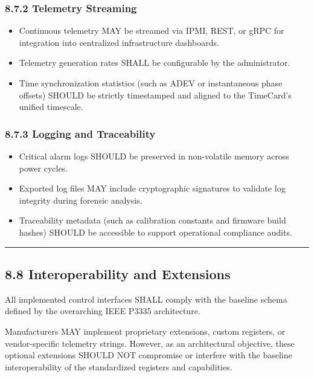 \subsubsection{8.7.2 Telemetry Streaming}\label{telemetry-streaming}

\begin{itemize}
\tightlist
\item
  Continuous telemetry MAY be streamed via IPMI, REST, or gRPC for
  integration into centralized infrastructure dashboards.
\item
  Telemetry generation rates SHALL be configurable by the administrator.
\item
  Time synchronization statistics (such as ADEV or instantaneous phase
  offsets) SHOULD be strictly timestamped and aligned to the TimeCard's
  unified timescale.
\end{itemize}

\subsubsection{8.7.3 Logging and
Traceability}\label{logging-and-traceability}

\begin{itemize}
\tightlist
\item
  Critical alarm logs SHOULD be preserved in non-volatile memory across
  power cycles.
\item
  Exported log files MAY include cryptographic signatures to validate
  log integrity during forensic analysis.
\item
  Traceability metadata (such as calibration constants and firmware
  build hashes) SHOULD be accessible to support operational compliance
  audits.
\end{itemize}

\begin{center}\rule{0.5\linewidth}{0.5pt}\end{center}

\subsection{8.8 Interoperability and
Extensions}\label{interoperability-and-extensions}

All implemented control interfaces SHALL comply with the baseline schema
defined by the overarching IEEE P3335 architecture.

Manufacturers MAY implement proprietary extensions, custom registers, or
vendor-specific telemetry strings. However, as an architectural
objective, these optional extensions SHOULD NOT compromise or interfere
with the baseline interoperability of the standardized registers and
capabilities.

